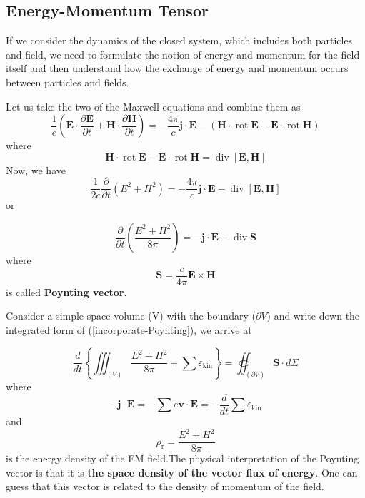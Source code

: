 \subsection{Energy-Momentum Tensor}
If we consider the dynamics of the closed system, which includes both particles and field, we need to formulate the notion of energy and momentum for the field itself and then understand how the exchange of energy and momentum occurs between particles and fields.


Let us take the two of the Maxwell equations and combine them as
\begin{equation}
\frac{1}{c}\left(\mathbf{E} \cdot \frac{\partial \mathbf{E}}{\partial t}+\mathbf{H} \cdot \frac{\partial \mathbf{H}}{\partial t}\right)=-\frac{4 \pi}{c} \mathbf{j} \cdot \mathbf{E} -(\mathbf{H} \cdot \operatorname{rot} \mathbf{E}-\mathbf{E} \cdot \operatorname{rot} \mathbf{H})
\end{equation}
where
$$
\mathbf{H} \cdot \operatorname{rot} \mathbf{E}-\mathbf{E} \cdot \operatorname{rot} \mathbf{H}=\operatorname{div}[\mathbf{E}, \mathbf{H}]
$$
Now, we have
$$
\frac{1}{2 c} \frac{\partial}{\partial t}\left(E^{2}+H^{2}\right)=-\frac{4 \pi}{c} \mathbf{j} \cdot \mathbf{E}-\operatorname{div}[\mathbf{E}, \mathbf{H}]
$$
or
\begin{qt}
\begin{equation}
\frac{\partial}{\partial t}\left(\frac{E^{2}+H^{2}}{8 \pi}\right)=-\mathbf{j} \cdot \mathbf{E}-\operatorname{div} \mathbf{S}
\label{incorporate-Poynting}
\end{equation}
where
    \begin{equation}
\mathbf{S}=\frac{c}{4 \pi} \mathbf{E} \times \mathbf{H}
\end{equation}
is called \textbf{Poynting vector}.
\end{qt}
Consider a simple space volume (V) with the boundary ($\partial V$) and write down the integrated form of (\ref{incorporate-Poynting}), we arrive at
\begin{qt}
\begin{equation}
\frac{d}{d t}\left\{\iiint_{(V)} \frac{E^{2}+H^{2}}{8 \pi}+\sum \varepsilon_{\mathrm{kin}}\right\}=\oiint_{(\partial V)} \mathbf{S} \cdot d \Sigma
\end{equation}
where
$$
-\mathbf{j} \cdot \mathbf{E}=-\sum e \mathbf{v} \cdot \mathbf{E}=-\frac{d}{d t} \sum \varepsilon_{\mathrm{kin}}
$$
and 
$$
\rho_{\mathrm{r}}=\frac{E^{2}+H^{2}}{8 \pi}
$$
is the energy density of the EM field.The physical interpretation of the Poynting vector is that it is \textbf{the space density of the vector flux of energy}. One can guess that this vector is related to the density of momentum of the field.
\end{qt}
